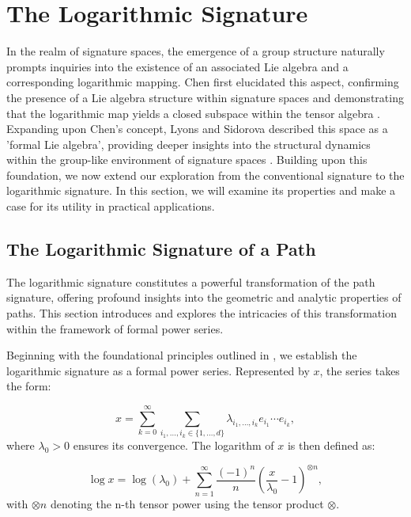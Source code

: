 
\section{The Logarithmic Signature}
\label{sec:logarithmic-signature}

In the realm of signature spaces, the emergence of a group structure naturally prompts inquiries into the existence of an associated Lie algebra and a corresponding logarithmic mapping. Chen first elucidated this aspect, confirming the presence of a Lie algebra structure within signature spaces and demonstrating that the logarithmic map yields a closed subspace within the tensor algebra \cite{chenIntegrationPathsGeometric1957}. Expanding upon Chen's concept, Lyons and Sidorova described this space as a 'formal Lie algebra', providing deeper insights into the structural dynamics within the group-like environment of signature spaces \cite{lyonsRadiusConvergenceLogarithmic2006}. Building upon this foundation, we now extend our exploration from the conventional signature to the logarithmic signature. In this section, we will examine its properties and make a case for its utility in practical applications.

\subsection{The Logarithmic Signature of a Path}
\label{subsec:log-signature-path}

The logarithmic signature constitutes a powerful transformation of the path signature, offering profound insights into the geometric and analytic properties of paths. This section introduces and explores the intricacies of this transformation within the framework of formal power series.

Beginning with the foundational principles outlined in \cite{chevyrevPrimerSignatureMethod2016}, we establish the logarithmic signature as a formal power series. Represented by \(x\), the series takes the form:

\begin{equation}
x = \sum_{k=0}^\infty \sum_{i_1,\ldots,i_k \in \{1,\ldots,d\}} \lambda_{i_1,\ldots,i_k} e_{i_1} \cdots e_{i_k},
\end{equation}
where \(\lambda_0 > 0\) ensures its convergence. The logarithm of \(x\) is then defined as:

\begin{equation}
\log x = \log(\lambda_0) + \sum_{n=1}^\infty \frac{(-1)^{n}}{n} \left( \frac{x}{\lambda_0} - 1 \right)^{\otimes n},
\end{equation}
with \(\otimes n\) denoting the n-th tensor power using the tensor product \(\otimes\).

